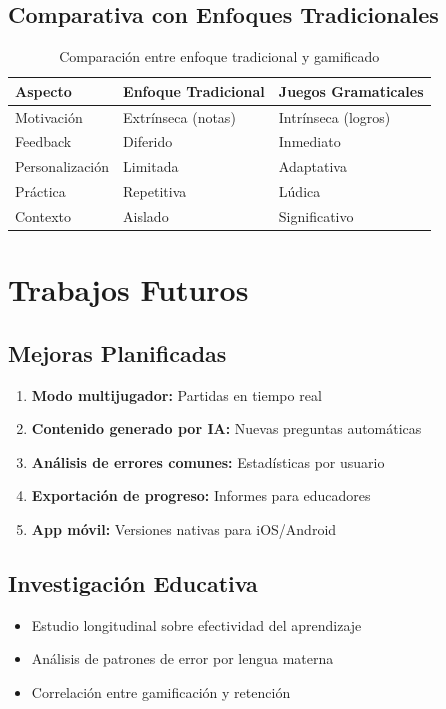 \documentclass[12pt,a4paper]{article}
\begin{document}
\subsection{Comparativa con Enfoques Tradicionales}

\begin{table}[H]
\centering
\caption{Comparación entre enfoque tradicional y gamificado}
\begin{tabular}{|l|l|l|}
\hline
\textbf{Aspecto} & \textbf{Enfoque Tradicional} & \textbf{Juegos Gramaticales} \\
\hline
Motivación & Extrínseca (notas) & Intrínseca (logros) \\
Feedback & Diferido & Inmediato \\
Personalización & Limitada & Adaptativa \\
Práctica & Repetitiva & Lúdica \\
Contexto & Aislado & Significativo \\
\hline
\end{tabular}
\end{table}

\section{Trabajos Futuros}

\subsection{Mejoras Planificadas}

\begin{enumerate}
    \item \textbf{Modo multijugador:} Partidas en tiempo real
    \item \textbf{Contenido generado por IA:} Nuevas preguntas automáticas
    \item \textbf{Análisis de errores comunes:} Estadísticas por usuario
    \item \textbf{Exportación de progreso:} Informes para educadores
    \item \textbf{App móvil:} Versiones nativas para iOS/Android
\end{enumerate}

\subsection{Investigación Educativa}

\begin{itemize}
    \item Estudio longitudinal sobre efectividad del aprendizaje
    \item Análisis de patrones de error por lengua materna
    \item Correlación entre gamificación y retención
\end{itemize}
\end{document}
